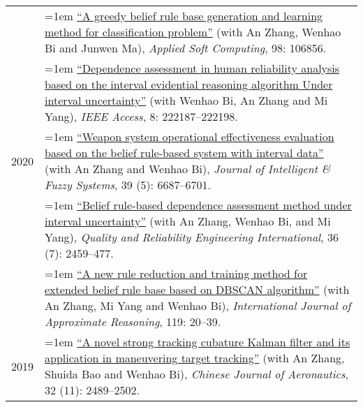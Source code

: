 \documentclass[11pt,english]{article}
\begin{document}
\begin{tabular}{p{.85in}>{\hangindent=1em}p{5.65in}<{\raggedright}}
 &  \href{https://doi.org/10.1016/j.asoc.2020.106856}{``A greedy belief rule base generation and learning method for classification problem''} (with An Zhang, Wenhao Bi and Junwen Ma), \textit{Applied Soft Computing}, 98: 106856. \\

 &  \href{https://doi.org/10.1109/ACCESS.2020.3043848}{``Dependence assessment in human reliability analysis based on the interval evidential reasoning algorithm Under interval uncertainty''} (with Wenhao Bi, An Zhang and Mi Yang), \textit{IEEE Access}, 8: 222187--222198. \\

2020 &  \href{https://doi.org/10.3233/JIFS-190651}{``Weapon system operational effectiveness evaluation based on the belief rule-based system with interval data''} (with An Zhang and Wenhao Bi), \textit{Journal of Intelligent \& Fuzzy Systems}, 39 (5): 6687--6701. \\
 &  \href{https://doi.org/10.1002/qre.2708}{``Belief rule-based dependence assessment method under interval uncertainty''} (with An Zhang, Wenhao Bi, and Mi Yang), \textit{Quality and Reliability Engineering International}, 36 (7): 2459--477. \\
 
 &  \href{https://doi.org/10.1016/j.ijar.2019.12.016}{``A new rule reduction and training method for extended belief rule base based on DBSCAN algorithm''} (with An Zhang, Mi Yang and Wenhao Bi), \textit{International Journal of Approximate Reasoning}, 119: 20--39. \\

2019 &  \href{https://doi.org/10.1016/j.cja.2019.07.025}{``A novel strong tracking cubature Kalman filter and its application in maneuvering target tracking''} (with An Zhang, Shuida Bao and Wenhao Bi), \textit{Chinese Journal of Aeronautics}, 32 (11): 2489--2502. \\
\end{tabular}
\end{document}
